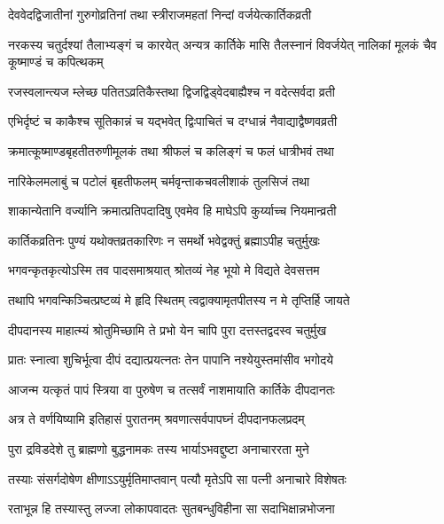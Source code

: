 \twolineshloka
{देववेदद्विजातीनां गुरुगोव्रतिनां तथा}
{स्त्रीराजमहतां निन्दां वर्जयेत्कार्तिकव्रती} %

\threelineshloka
{नरकस्य चतुर्दश्यां तैलाभ्यङ्गं च कारयेत्}
{अन्यत्र कार्तिके मासि तैलस्नानं विवर्जयेत्}
{नालिकां मूलकं चैव कूष्माण्डं च कपित्थकम्} %

\twolineshloka
{रजस्वलान्त्यज म्लेच्छ पतितऽव्रतिकैस्तथा}
{द्विजद्विड्वेदबाह्यैश्च न वदेत्सर्वदा व्रती} %

\twolineshloka
{एभिर्दृष्टं च काकैश्च सूतिकान्नं च यद्भवेत्}
{द्विःपाचितं च दग्धान्नं नैवाद्याद्वैष्णवव्रती} %

\twolineshloka
{क्रमात्कूष्माण्डबृहतीतरुणीमूलकं तथा}
{श्रीफलं च कलिङ्गं च फलं धात्रीभवं तथा} %

\twolineshloka
{नारिकेलमलाबुं च पटोलं बृहतीफलम्}
{चर्मवृन्ताकचवलीशाकं तुलसिजं तथा} %

\twolineshloka
{शाकान्येतानि वर्ज्यानि क्रमात्प्रतिपदादिषु}
{एवमेव हि माघेऽपि कुर्य्याच्च नियमान्व्रती} %

\twolineshloka
{कार्तिकव्रतिनः पुण्यं यथोक्तव्रतकारिणः}
{न समर्थो भवेद्वक्तुं ब्रह्माऽपीह चतुर्मुखः} %





\twolineshloka
{भगवन्कृतकृत्योऽस्मि तव पादसमाश्रयात्}
{श्रोतव्यं नेह भूयो मे विद्यते देवसत्तम} %

\twolineshloka
{तथापि भगवन्किञ्चित्प्रष्टव्यं मे हृदि स्थितम्}
{त्वद्वाक्यामृतपीतस्य न मे तृप्तिर्हि जायते} %

\twolineshloka
{दीपदानस्य माहात्म्यं श्रोतुमिच्छामि ते प्रभो}
{येन चापि पुरा दत्तस्तद्वदस्व चतुर्मुख} %


\twolineshloka
{प्रातः स्नात्वा शुचिर्भूत्वा दीपं दद्यात्प्रयत्नतः}
{तेन पापानि नश्येयुस्तमांसीव भगोदये} %

\twolineshloka
{आजन्म यत्कृतं पापं स्त्रिया वा पुरुषेण च}
{तत्सर्वं नाशमायाति कार्तिके दीपदानतः} %

\twolineshloka
{अत्र ते वर्णयिष्यामि इतिहासं पुरातनम्}
{श्रवणात्सर्वपापघ्नं दीपदानफलप्रदम्} %

\twolineshloka
{पुरा द्रविडदेशे तु ब्राह्मणो बुद्धनामकः}
{तस्य भार्याऽभवद्दुष्टा अनाचाररता मुने} %

\twolineshloka
{तस्याः संसर्गदोषेण क्षीणाऽऽयुर्मृतिमाप्तवान्}
{पत्यौ मृतेऽपि सा पत्नी अनाचारे विशेषतः} %

\twolineshloka
{रताभून्न हि तस्यास्तु लज्जा लोकापवादतः}
{सुतबन्धुविहीना सा सदाभिक्षान्नभोजना} %

